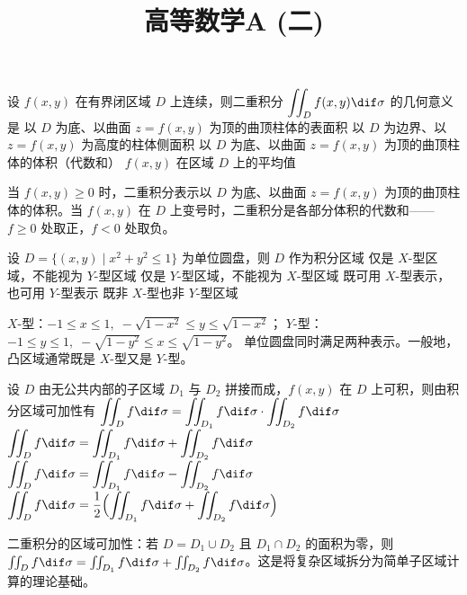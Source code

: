\documentclass[answer]{THUExam}
\title{高等数学A (二)}
\author{}
\begin{document}
\vspace{1cm}
\makehead

\vspace{1cm}


\begin{problem}
设 $f(x,y)$ 在有界闭区域 $D$ 上连续，则二重积分 $\displaystyle\iint_D f(x,y)\dif\sigma$ 的几何意义是
\options
{以 $D$ 为底、以曲面 $z=f(x,y)$ 为顶的曲顶柱体的表面积}
{以 $D$ 为边界、以 $z=f(x,y)$ 为高度的柱体侧面积}
{以 $D$ 为底、以曲面 $z=f(x,y)$ 为顶的曲顶柱体的体积（代数和）}
{$f(x,y)$ 在区域 $D$ 上的平均值}
\end{problem}
\begin{note}
当 $f(x,y)\ge 0$ 时，二重积分表示以 $D$ 为底、以曲面 $z=f(x,y)$ 为顶的曲顶柱体的体积。当 $f(x,y)$ 在 $D$ 上变号时，二重积分是各部分体积的代数和——$f\ge 0$ 处取正，$f<0$ 处取负。
\end{note}
\bigskip

\begin{problem}
设 $D=\{(x,y)\mid x^2+y^2\le 1\}$ 为单位圆盘，则 $D$ 作为积分区域
\options
{仅是 $X$-型区域，不能视为 $Y$-型区域}
{仅是 $Y$-型区域，不能视为 $X$-型区域}
{既可用 $X$-型表示，也可用 $Y$-型表示}
{既非 $X$-型也非 $Y$-型区域}
\end{problem}
\begin{note}
$X$-型：$-1\le x\le 1,\;-\sqrt{1-x^2}\le y\le\sqrt{1-x^2}$；
$Y$-型：$-1\le y\le 1,\;-\sqrt{1-y^2}\le x\le\sqrt{1-y^2}$。
单位圆盘同时满足两种表示。一般地，凸区域通常既是 $X$-型又是 $Y$-型。
\end{note}
\bigskip

\begin{problem}
设 $D$ 由无公共内部的子区域 $D_1$ 与 $D_2$ 拼接而成，$f(x,y)$ 在 $D$ 上可积，则由积分区域可加性有
\options
{$\displaystyle\iint_D f\dif\sigma = \iint_{D_1} f\dif\sigma \cdot \iint_{D_2} f\dif\sigma$}
{$\displaystyle\iint_D f\dif\sigma = \iint_{D_1} f\dif\sigma + \iint_{D_2} f\dif\sigma$}
{$\displaystyle\iint_D f\dif\sigma = \iint_{D_1} f\dif\sigma - \iint_{D_2} f\dif\sigma$}
{$\displaystyle\iint_D f\dif\sigma = \frac{1}{2}\Bigl(\iint_{D_1} f\dif\sigma + \iint_{D_2} f\dif\sigma\Bigr)$}
\end{problem}
\begin{note}
二重积分的区域可加性：若 $D=D_1\cup D_2$ 且 $D_1\cap D_2$ 的面积为零，则 $\iint_D f\dif\sigma=\iint_{D_1}f\dif\sigma+\iint_{D_2}f\dif\sigma$。这是将复杂区域拆分为简单子区域计算的理论基础。
\end{note}
\bigskip
\end{document}
